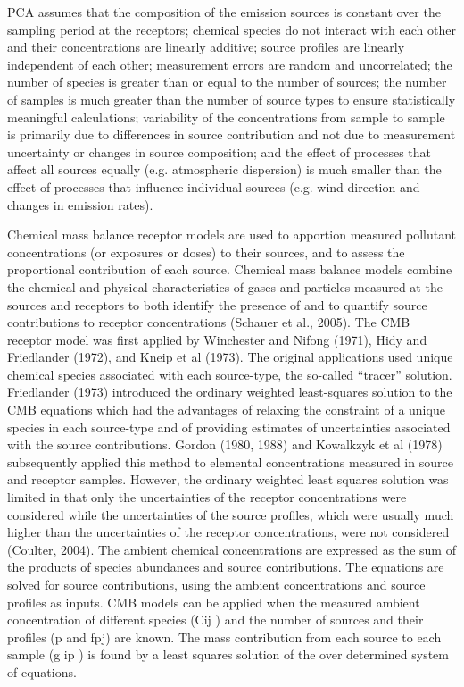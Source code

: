 \documentclass{nwureport}
\begin{document}
PCA assumes that the composition of the emission sources is constant over the sampling period at the
receptors; chemical species do not interact with each other and their concentrations are linearly additive;
source profiles are linearly independent of each other; measurement errors are random and uncorrelated;
the number of species is greater than or equal to the number of sources; the number of samples is much
greater than the number of source types to ensure statistically meaningful calculations; variability of the
concentrations from sample to sample is primarily due to differences in source contribution and not due to
measurement uncertainty or changes in source composition; and the effect of processes that affect all
sources equally (e.g. atmospheric dispersion) is much smaller than the effect of processes that influence
individual sources (e.g. wind direction and changes in emission rates).

Chemical mass balance receptor models are used to apportion measured pollutant concentrations (or
exposures or doses) to their sources, and to assess the proportional contribution of each source. Chemical
mass balance models combine the chemical and physical characteristics of gases and particles measured at
the sources and receptors to both identify the presence of and to quantify source contributions to receptor
concentrations (Schauer et al., 2005). The CMB receptor model was first applied by Winchester and Nifong
(1971), Hidy and Friedlander (1972), and Kneip et al (1973). The original applications used unique chemical
species associated with each source-type, the so-called “tracer” solution. Friedlander (1973) introduced the
ordinary weighted least-squares solution to the CMB equations which had the advantages of relaxing the
constraint of a unique species in each source-type and of providing estimates of uncertainties associated
with the source contributions. Gordon (1980, 1988) and Kowalkzyk et al (1978) subsequently applied this
method to elemental concentrations measured in source and receptor samples. However, the ordinary
weighted least squares solution was limited in that only the uncertainties of the receptor concentrations were
considered while the uncertainties of the source profiles, which were usually much higher than the
uncertainties of the receptor concentrations, were not considered (Coulter, 2004). The ambient chemical
concentrations are expressed as the sum of the products of species abundances and source
contributions. The equations are solved for source contributions, using the ambient concentrations and
source profiles as inputs. CMB models can be applied when the measured ambient concentration of different
species (Cij ) and the number of sources and their profiles (p and fpj) are known. The mass contribution
from each source to each sample (g ip ) is found by a least squares solution of the over determined system of
equations.
\end{document}
